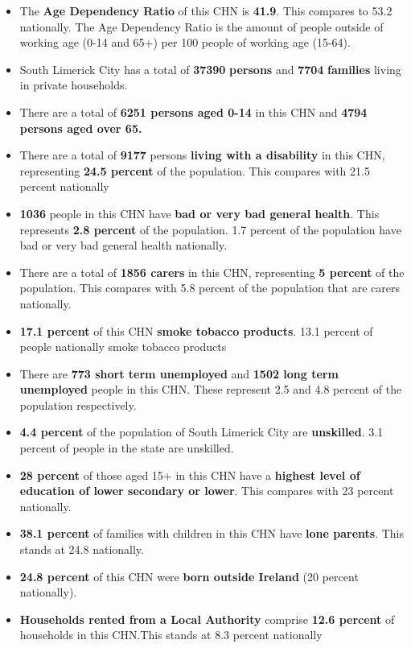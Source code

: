 \documentclass{article}
\begin{document}
\begin{itemize}

\item The \textbf{Age Dependency Ratio} of this CHN is  \textbf{41.9}. This compares to 53.2 nationally. The Age Dependency Ratio is the amount of people outside of working age (0-14 and 65+) per 100 people of working age (15-64). 

\item South Limerick City has a total of \textbf{\num{37390}} \textbf{persons} and  \textbf{\num{7704}} \textbf{families} living in private households.

\item There are a total of \textbf{\num{6251} persons aged 0-14} in this CHN and \textbf{\num{4794} persons aged over 65.} 

\item There are a total of \textbf{\num{9177}} persons \textbf{living with a disability} in this CHN, representing \textbf{24.5 percent} of the population. This compares with  21.5 percent nationally

\item \textbf{\num{1036}} people in this CHN have \textbf{bad or very bad general health}. This represents \textbf{2.8 percent} of the population. 1.7 percent of the population have bad or very bad general health nationally. 

\item There are a total of \textbf{\num{1856} carers} in this CHN, representing \textbf{5 percent} of the population. This compares with 5.8 percent of the population that are carers nationally. 

\item \textbf{17.1 percent} of this CHN \textbf{smoke tobacco products}. 13.1 percent of people nationally smoke tobacco products

\item There are \textbf{\num{773} short term unemployed} and \textbf{\num{1502} long term unemployed} people in this CHN. These represent 2.5 and 4.8 percent of the population respectively.

\item  \textbf{4.4 percent} of the population of South Limerick City are \textbf{unskilled}. 3.1 percent of people in the state are unskilled.

\item \textbf{28 percent} of those aged 15+ in this CHN have a \textbf{highest level of education of lower secondary or lower}. This compares with 23 percent nationally. 

\item \textbf{38.1 percent} of families with children in this CHN have \textbf{lone parents}. This stands at 24.8 nationally.

\item \textbf{24.8 percent} of this CHN were \textbf{born outside Ireland} (20 percent nationally).

\item \textbf{Households rented from a Local Authority} comprise \textbf{12.6 percent} of households in this CHN.This stands at 8.3 percent nationally

\end{itemize}
\end{document}
